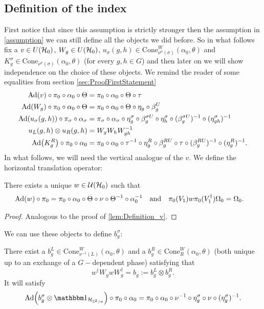\documentclass[12pt,a4paper,twoside]{article}
\numberwithin{equation}{section}
\begin{document}
\subsection{Definition of the index}
 First notice that since this assumption is strictly stronger then the assumption in \ref{assumption} we can still define all the objects we did before. So in what follows fix a $v\in U(\mathcal H_0)$, $W_g\in U(\mathcal H_0)$, $u_\sigma(g,h)\in \textrm{Cone}_{\nu^\sigma(\sigma)}^W(\alpha_0,\theta)$ and $K_g^\sigma\in\textrm{Cone}_{\nu^\sigma(\sigma)}(\alpha_0,\theta)$ (for every $g,h\in G$) and then later on we will show independence on the choice of these objects. We remind the reader of some equalities from section \ref{sec:ProofFirstStatement}
\begin{align}
		\Ad{v}\circ\pi_0\circ\alpha_0\circ\Theta&=\pi_0\circ\alpha_0\circ\Theta\circ\tau\\
		\Ad{W_g}\circ\pi_0\circ\alpha_0\circ\Theta&=\pi_0\circ\alpha_0\circ\Theta\circ\eta_g\circ\beta_g^U\\
		\Ad{u_\sigma(g,h)}\circ\pi_\sigma\circ\alpha_\sigma&=\pi_\sigma\circ\alpha_\sigma\circ\eta_g^\sigma\circ\beta_g^{\sigma U}\circ\eta_h^{\sigma}\circ(\beta_g^{\sigma U})^{-1}\circ(\eta^\sigma_{gh})^{-1}\\
		u_L(g,h)\otimes u_R(g,h)&=W_gW_hW_{gh}^{-1}\\
		\Ad{K^R_g}\circ\pi_0\circ\alpha_0&=\pi_0\circ \alpha_0\circ \tau^{-1}\circ \eta_g^R\circ\beta_g^{RU}\circ\tau\circ(\beta_g^{RU})^{-1}\circ(\eta_g^{R})^{-1}.
	\end{align}
In what follows, we will need the vertical analogue of the $v$. We define the horizontal translation operator:
\begin{lemma}\label{lem:Definition_w}
	There exists a unique $w\in\mathcal U(\mathcal H_0)$ such that
	\begin{align}
		\Ad{w}\circ\pi_0&=\pi_0\circ\alpha_0\circ\Theta\circ\nu\circ\Theta^{-1}\circ\alpha_0^{-1}&&\text{and}&\pi_0(V_1)w\pi_0(V_1^\dagger)\Omega_0&=\Omega_0.
	\end{align}
\end{lemma}
\begin{proof}
	Analogous to the proof of \ref{lem:Definition_v}.
\end{proof}
 We can use these objects to define $b^\sigma_g$:
\begin{lemma}
	There exist a $b_g^L\in\textrm{Cone}_{\nu^{-1}(L)}^W(\alpha_0,\theta)$ and a $b_g^R\in\textrm{Cone}_{R}^W(\alpha_0,\theta)$ (both unique up to an exchange of a $G-$dependent phase) satisfying that
	\begin{equation}
		w^\dagger W_g w W_g^\dagger=b_g:=b_g^L\otimes b_g^R.
	\end{equation}
	It will satisfy
	\begin{equation}\label{eq:automorphismBelongingTo_b}
		\Ad{b_g^\sigma\otimes\id_{\HH_{\ZZ^2/\sigma}}}\circ\pi_0\circ\alpha_0=\pi_0\circ\alpha_0\circ\nu^{-1}\circ\eta_g^\sigma\circ\nu\circ(\eta_g^\sigma)^{-1}.
	\end{equation}
\end{lemma}
\end{document}
